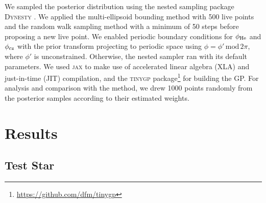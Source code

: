 We sampled the posterior distribution using the nested sampling package \textsc{Dynesty} \citep{Speagle2020,Koposov.Speagle.ea2023}. We applied the multi-ellipsoid bounding method \citep{Feroz.Hobson.ea2009} with 500 live points and the random walk sampling method \citep{Skilling2006} with a minimum of 50 steps before proposing a new live point. We enabled periodic boundary conditions for \(\phi_{{\mathrm{He}}}\) and \(\phi_{{\mathrm{cz}}}\) with the prior transform projecting to periodic space using \(\phi = \phi'\,\mathrm{mod}\,2\pi\), where \(\phi'\) is unconstrained. Otherwise, the nested sampler ran with its default parameters. We used \textsc{jax} \citep{Bradbury.Frostig.ea2018} to make use of accelerated linear algebra (XLA) and just-in-time (JIT) compilation, and the \textsc{tinygp} package\footnote{\url{https://github.com/dfm/tinygp}} for building the GP. For analysis and comparison with the  method, we drew 1000 points randomly from the posterior samples according to their estimated weights.


\section{Results}\label{sec:glitch-results}



\subsection{Test Star}

